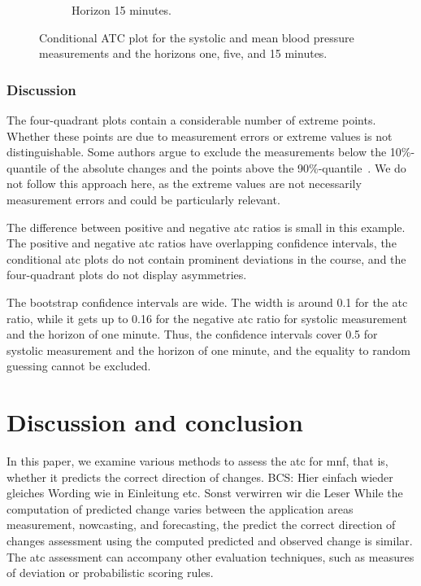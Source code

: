 \documentclass[pdflatex]{sn-jnl}
\theoremstyle{plain}%
\theoremstyle{definition}
\begin{document}
\begin{figure}
\begin{subfigure}[t]{.32\textwidth}
        \caption{Horizon 15 minutes.}
    \end{subfigure}\hspace{0.01\textwidth}
    \caption{Conditional ATC plot for the systolic and mean blood pressure measurements and the horizons one, five, and 15 minutes. }
    \label{fig:app-mimic-cond-prob}
\end{figure}




\subsubsection*{Discussion}

The four-quadrant plots contain a considerable number of extreme points.
Whether these points are due to measurement errors or extreme values is not distinguishable.
Some authors argue to exclude the measurements below the 10\%-quantile of the absolute changes and the points above the 90\%-quantile~\citep[see][]{Critchley2010}.
We do not follow this approach here, as the extreme values are not necessarily measurement errors and could be particularly relevant.

The difference between positive and negative \ac{atc} ratios is small in this example.
The positive and negative \ac{atc} ratios have overlapping confidence intervals, the conditional \ac{atc} plots do not contain prominent deviations in the course, and the four-quadrant plots do not display asymmetries.

The bootstrap confidence intervals are wide.
The width is around 0.1 for the \ac{atc} ratio, while it gets up to 0.16 for the negative \ac{atc} ratio for systolic measurement and the horizon of one minute.
Thus, the confidence intervals cover 0.5 for systolic measurement and the horizon of one minute, and the equality to random guessing cannot be excluded.



\section{Discussion and conclusion}\label{sec:atc-conclusion}

In this paper, we examine various methods to assess the \acf{atc} for \acf{mnf}, that is, whether it predicts the correct direction of changes.
BCS: Hier einfach wieder gleiches Wording wie in Einleitung etc. Sonst verwirren wir die Leser
While the computation of predicted change varies between the application areas measurement, nowcasting, and forecasting, the predict the correct direction of changes assessment using the computed predicted and observed change is similar.
The \ac{atc} assessment can accompany other evaluation techniques, such as measures of deviation or probabilistic scoring rules.
\end{document}
